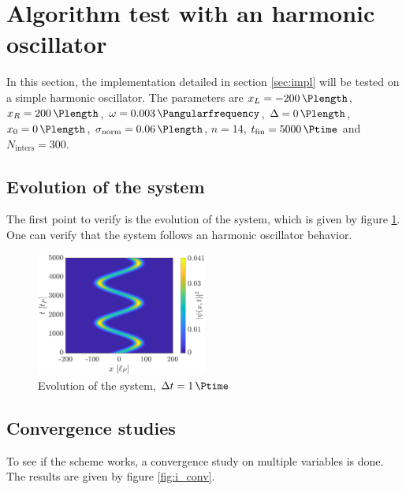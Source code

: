 \documentclass[a4paper,12pt,twoside]{article}
\begin{document}


\newpage
\section{Algorithm test with an harmonic oscillator}\label{sec:har_osc}
  In this section, the implementation detailed in section \ref{sec:impl} will be tested on a simple harmonic oscillator.
  The parameters are $x_L=\SI{-200}{\Plength}$, $x_R=\SI{200}{\Plength}$, $\omega = \SI{0.003}{\Pangularfrequency}$, $\Delta = \SI{0}{\Plength}$, $x_0 = \SI{0}{\Plength}$, $\sigma_\text{norm} = \SI{0.06}{\Plength}$, $n=14$, $t_\text{fin} = \SI{5000}{\Ptime}$ and $N_\text{inters} = 300$.


  \subsection{Evolution of the system}
  The first point to verify is the evolution of the system, which is given by figure \ref{fig:i_evo}.
  One can verify that the system follows an harmonic oscillator behavior.

  \begin{figure}[h]
    \centering
    \includegraphics[width=0.5\textwidth]{graphs/i_evo.eps}
    \caption{Evolution of the system, $\Delta t = \SI{1}{\Ptime}$}
    \label{fig:i_evo}
  \end{figure}

  \subsection{Convergence studies}
    To see if the scheme works, a convergence study on multiple variables is done.
    The results are given by figure \ref{fig:i_conv}.
\end{document}
